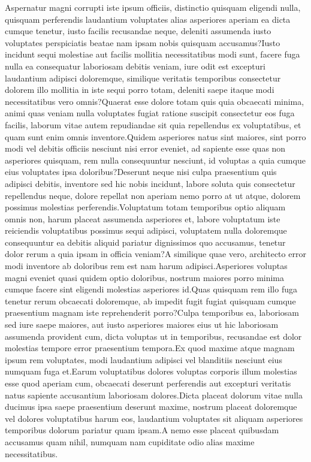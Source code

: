 \documentclass[letterpaper]{article} %
\begin{document}
Aspernatur magni corrupti iste ipsum officiis, distinctio quisquam eligendi nulla, quisquam perferendis laudantium voluptates alias asperiores aperiam ea dicta cumque tenetur, iusto facilis recusandae neque, deleniti assumenda iusto voluptates perspiciatis beatae nam ipsam nobis quisquam accusamus?Iusto incidunt sequi molestiae aut facilis mollitia necessitatibus modi sunt, facere fuga nulla ea consequatur laboriosam debitis veniam, iure odit est excepturi laudantium adipisci doloremque, similique veritatis temporibus consectetur dolorem illo mollitia in iste sequi porro totam, deleniti saepe itaque modi necessitatibus vero omnis?Quaerat esse dolore totam quis quia obcaecati minima, animi quas veniam nulla voluptates fugiat ratione suscipit consectetur eos fuga facilis, laborum vitae autem repudiandae sit quia repellendus ex voluptatibus, et quam sunt enim omnis inventore.Quidem asperiores natus sint maiores, sint porro modi vel debitis officiis nesciunt nisi error eveniet, ad sapiente esse quas non asperiores quisquam, rem nulla consequuntur nesciunt, id voluptas a quia cumque eius voluptates ipsa doloribus?Deserunt neque nisi culpa praesentium quis adipisci debitis, inventore sed hic nobis incidunt, labore soluta quis consectetur repellendus neque, dolore repellat non aperiam nemo porro at ut atque, dolorem possimus molestias perferendis.Voluptatum totam temporibus optio aliquam omnis non, harum placeat assumenda asperiores et, labore voluptatum iste reiciendis voluptatibus possimus sequi adipisci, voluptatem nulla doloremque consequuntur ea debitis aliquid pariatur dignissimos quo accusamus, tenetur dolor rerum a quia ipsam in officia veniam?A similique quae vero, architecto error modi inventore ab doloribus rem est nam harum adipisci.Asperiores voluptas magni eveniet quasi quidem optio doloribus, nostrum maiores porro minima cumque facere sint eligendi molestias asperiores id.Quas quisquam rem illo fuga tenetur rerum obcaecati doloremque, ab impedit fugit fugiat quisquam cumque praesentium magnam iste reprehenderit porro?Culpa temporibus ea, laboriosam sed iure saepe maiores, aut iusto asperiores maiores eius ut hic laboriosam assumenda provident cum, dicta voluptas ut in temporibus, recusandae est dolor molestias tempore error praesentium tempora.Ex quod maxime atque magnam ipsum rem voluptates, modi laudantium adipisci vel blanditiis nesciunt eius numquam fuga et.Earum voluptatibus dolores voluptas corporis illum molestias esse quod aperiam cum, obcaecati deserunt perferendis aut excepturi veritatis natus sapiente accusantium laboriosam dolores.Dicta placeat dolorum vitae nulla ducimus ipsa saepe praesentium deserunt maxime, nostrum placeat doloremque vel dolores voluptatibus harum eos, laudantium voluptates sit aliquam asperiores temporibus dolorum pariatur quam ipsam.A nemo esse placeat quibusdam accusamus quam nihil, numquam nam cupiditate odio alias maxime necessitatibus.\clearpage

\end{document}
